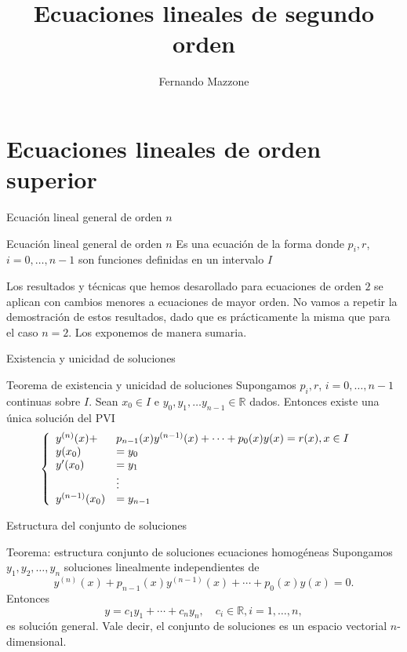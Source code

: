 \documentclass[hyperref={colorlinks=true}]{beamer}
\title[Ecuaciones lineales de segundo orden] %
{%
 Ecuaciones lineales de segundo orden
}
\author[] %
{Fernando Mazzone}
\institute[Depto de Matemática] %
{
 Depto de Matemática\\
Facultad de Ciencias Exactas Físico-Químicas y Naturales\\
Universidad Nacional de Río Cuarto}
\newcommand{\rr}{\mathbb{R}}
\begin{document}
\section{Ecuaciones lineales de orden superior}

\begin{frame}{Ecuación lineal general de orden $n$}
\begin{block}{Ecuación lineal general de orden $n$}
Es una ecuación de la forma
donde $p_i,r$, $i=0,\ldots,n-1$ son funciones definidas en un intervalo $I$
\end{block}


Los resultados y técnicas que hemos desarollado para ecuaciones de orden $2$ se aplican con cambios menores a ecuaciones de mayor orden. No vamos a repetir la demostración de estos resultados, dado que es prácticamente la misma que para el caso $n=2$. Los exponemos de manera sumaria.
\end{frame}

\begin{frame}{Existencia y unicidad de soluciones}
\begin{block}{Teorema de existencia y unicidad de soluciones}
 Supongamos $p_i,r$, $i=0,\ldots,n-1$ continuas sobre $I$. Sean $x_0\in I$ e $y_0,y_1,\ldots y_{n-1}\in\rr$ dados. Entonces existe una única solución del PVI
 \[\left\{
 \begin{array}{l l l}
   y^{(n)}(x)+&p_{n-1}(x)y^{(n-1)}(x)+\cdots+p_0(x)y(x)=r(x),x\in I\\
   y(x_0)&=y_0&\\
   y'(x_0)&=y_1&\\
   &\vdots\\
  y^{(n-1)}(x_0)&=y_{n-1}&\\
  \end{array}\right.
\]

\end{block}
\end{frame}

\begin{frame}{Estructura del conjunto de soluciones}

\begin{block}{Teorema: estructura conjunto de soluciones ecuaciones homogéneas}
Supongamos $y_1,y_2,\ldots,y_n$ soluciones linealmente independientes de 
\[y^{(n)}(x)+p_{n-1}(x)y^{(n-1)}(x)+\cdots+p_0(x)y(x)=0.\]
Entonces 
\[y=c_1y_1+\cdots+c_ny_n,\quad c_i\in\rr, i=1,\ldots,n,\]
es solución general. Vale decir, el conjunto de soluciones es un espacio vectorial $n$-dimensional.
\end{block}
\end{frame}
\end{document}
